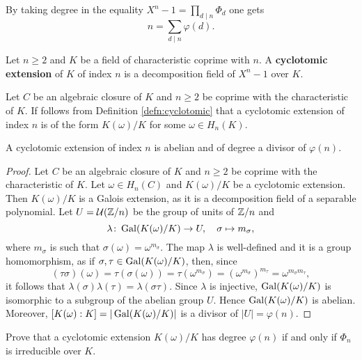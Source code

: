By taking degree in the equality 
$X^n-1=\prod_{d\mid n}\Phi_d$ 
one gets 
\[
n=\sum_{d\mid n}\varphi(d).
\]

\begin{definition}
\label{defn:cyclotomic}
    Let $n\geq2$ and $K$ be a field of characteristic coprime with $n$. A 
    \textbf{cyclotomic extension} of $K$ of index $n$ is a 
    decomposition field of $X^n-1$ over $K$. 
\end{definition}

Let $C$ be an algebraic closure of $K$ and $n\geq2$ be coprime with the characteristic of $K$. 
If follows from Definition \ref{defn:cyclotomic} 
that a cyclotomic extension of index $n$ is of the form 
$K(\omega)/K$ for some $\omega\in H_n(K)$. 

\begin{proposition}
    A cyclotomic extension of index $n$ is abelian and of degree a divisor of $\varphi(n)$. 
\end{proposition}

\begin{proof}
    Let $C$ be an algebraic closure of $K$ and $n\geq2$ be coprime with the characteristic of $K$. 
    Let $\omega\in H_n(C)$ and $K(\omega)/K$ be a cyclotomic extension. Then $K(\omega)/K$
    is a Galois extension, as it is a decomposition field of a separable polynomial. 
    Let $U=\mathcal{U}(\mathbb{Z}/n)$ be the group of units of $\mathbb{Z}/n$ and 
    \[
    \lambda\colon \operatorname{Gal}(K(\omega)/K)\to U,
    \quad
    \sigma\mapsto m_{\sigma},
    \]
    where $m_{\sigma}$ is such that $\sigma(\omega)=\omega^{m_{\sigma}}$. The map $\lambda$ is well-defined and
    it is a group homomorphism, as if $\sigma,\tau\in\operatorname{Gal}(K(\omega)/K)$, then, since 
    \[
        (\tau\sigma)(\omega)=\tau(\sigma(\omega))=\tau(\omega^{m_\sigma})=\left(\omega^{m_\sigma}\right)^{m_\tau}=\omega^{m_\sigma m_\tau},
    \]
    it follows that $\lambda(\sigma)\lambda(\tau)=\lambda(\sigma\tau)$. Since 
    $\lambda$ is injective, $\operatorname{Gal}(K(\omega)/K)$ is isomorphic to a subgroup 
    of the abelian group $U$. Hence $\operatorname{Gal}(K(\omega)/K)$ is abelian. Moreover, 
    $[K(\omega):K]=|\operatorname{Gal}(K(\omega)/K)|$ is a divisor of $|U|=\varphi(n)$. 
\end{proof}

\begin{exercise}
    Prove that a cyclotomic extension $K(\omega)/K$ has degree $\varphi(n)$ if and only if 
    $\Phi_n$ is irreducible over $K$. 
\end{exercise}

